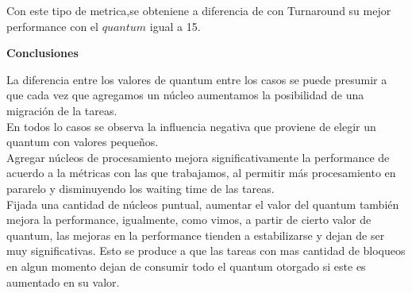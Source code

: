    \indent Con este tipo de metrica,se obteniene a diferencia de con Turnaround  
   su mejor performance con el $quantum$ igual a 15.\\
  
 \begin{center}
  \textbf{Conclusiones}
 \end{center}


\indent \indent La diferencia entre los valores de quantum entre los casos 
se puede presumir a que cada vez que agregamos un núcleo aumentamos 
la posibilidad de una migración de la tareas.\\
\indent \indent En todos lo casos se observa la influencia negativa que proviene 
de elegir un quantum con valores pequeños.\\
\indent \indent Agregar núcleos de procesamiento mejora significativamente 
la performance de acuerdo a la métricas con las que
trabajamos, al permitir más procesamiento en pararelo y disminuyendo 
los waiting time de las tareas.\\
\indent \indent  Fijada una cantidad de núcleos puntual, aumentar el valor del
quantum también mejora la performance, igualmente, como vimos, a partir de cierto valor 
de quantum, las mejoras en la performance tienden a estabilizarse y dejan de ser 
muy significativas. 
Esto se produce a que las tareas con mas cantidad de bloqueos en 
algun momento dejan de consumir todo el quantum otorgado si este es aumentado en su valor. 
 
 
 
